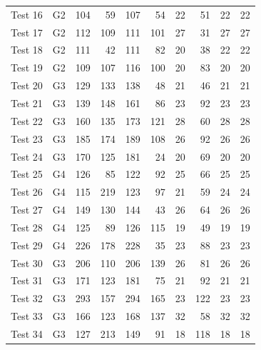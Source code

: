 \begin{longtable}{llrrrrrrrr}
Test 16 & G2 & 104 & 59 & 107 & 54 & 22 & 51 & 22 & 22 \\
Test 17 & G2 & 112 & 109 & 111 & 101 & 27 & 31 & 27 & 27 \\
Test 18 & G2 & 111 & 42 & 111 & 82 & 20 & 38 & 22 & 22 \\
Test 19 & G2 & 109 & 107 & 116 & 100 & 20 & 83 & 20 & 20 \\
Test 20 & G3 & 129 & 133 & 138 & 48 & 21 & 46 & 21 & 21 \\
Test 21 & G3 & 139 & 148 & 161 & 86 & 23 & 92 & 23 & 23 \\
Test 22 & G3 & 160 & 135 & 173 & 121 & 28 & 60 & 28 & 28 \\
Test 23 & G3 & 185 & 174 & 189 & 108 & 26 & 92 & 26 & 26 \\
Test 24 & G3 & 170 & 125 & 181 & 24 & 20 & 69 & 20 & 20 \\
Test 25 & G4 & 126 & 85 & 122 & 92 & 25 & 66 & 25 & 25 \\
Test 26 & G4 & 115 & 219 & 123 & 97 & 21 & 59 & 24 & 24 \\
Test 27 & G4 & 149 & 130 & 144 & 43 & 26 & 64 & 26 & 26 \\
Test 28 & G4 & 125 & 89 & 126 & 115 & 19 & 49 & 19 & 19 \\
Test 29 & G4 & 226 & 178 & 228 & 35 & 23 & 88 & 23 & 23 \\
Test 30 & G3 & 206 & 110 & 206 & 139 & 26 & 81 & 26 & 26 \\
Test 31 & G3 & 171 & 123 & 181 & 75 & 21 & 92 & 21 & 21 \\
Test 32 & G3 & 293 & 157 & 294 & 165 & 23 & 122 & 23 & 23 \\
Test 33 & G3 & 166 & 123 & 168 & 137 & 32 & 58 & 32 & 32 \\
Test 34 & G3 & 127 & 213 & 149 & 91 & 18 & 118 & 18 & 18 \\
\end{longtable}

